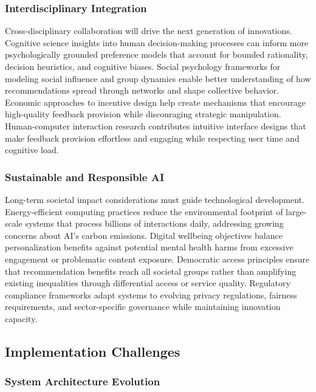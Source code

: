 \subsubsection{Interdisciplinary Integration}

Cross-disciplinary collaboration will drive the next generation of innovations. Cognitive science insights into human decision-making processes can inform more psychologically grounded preference models that account for bounded rationality, decision heuristics, and cognitive biases. Social psychology frameworks for modeling social influence and group dynamics enable better understanding of how recommendations spread through networks and shape collective behavior. Economic approaches to incentive design help create mechanisms that encourage high-quality feedback provision while discouraging strategic manipulation. Human-computer interaction research contributes intuitive interface designs that make feedback provision effortless and engaging while respecting user time and cognitive load.

\subsubsection{Sustainable and Responsible AI}

Long-term societal impact considerations must guide technological development. Energy-efficient computing practices reduce the environmental footprint of large-scale systems that process billions of interactions daily, addressing growing concerns about AI's carbon emissions. Digital wellbeing objectives balance personalization benefits against potential mental health harms from excessive engagement or problematic content exposure. Democratic access principles ensure that recommendation benefits reach all societal groups rather than amplifying existing inequalities through differential access or service quality. Regulatory compliance frameworks adapt systems to evolving privacy regulations, fairness requirements, and sector-specific governance while maintaining innovation capacity.

\subsection{Implementation Challenges}

\subsubsection{System Architecture Evolution}


